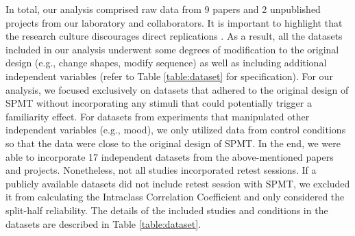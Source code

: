 \documentclass[sn-apa]{sn-jnl}%
\theoremstyle{thmstyleone}%
\theoremstyle{thmstyletwo}%
\theoremstyle{thmstylethree}%
\begin{document}
In total, our analysis comprised raw data from 9 papers and 2 unpublished projects from our laboratory and collaborators. It is important to highlight that the research culture discourages direct replications \parencite{makel2012replications}. As a result, all the datasets included in our analysis underwent some degrees of modification to the original design (e.g., change shapes, modify sequence) as well as including additional independent variables (refer to Table \ref{table:dataset} for specification). For our analysis, we focused exclusively on datasets that adhered to the original design of SPMT without incorporating any stimuli that could potentially trigger a familiarity effect. For datasets from experiments that manipulated other independent variables (e.g., mood), we only utilized data from control conditions so that the data were close to the original design of SPMT. In the end, we were able to incorporate 17 independent datasets from the above-mentioned papers and projects. Nonetheless, not all studies incorporated retest sessions. If a publicly available datasets did not include retest session with SPMT, we excluded it from calculating the Intraclass Correlation Coefficient and only considered the split-half reliability. The details of the included studies and conditions in the datasets are described in Table \ref{table:dataset}. 
\clearpage
\end{document}
